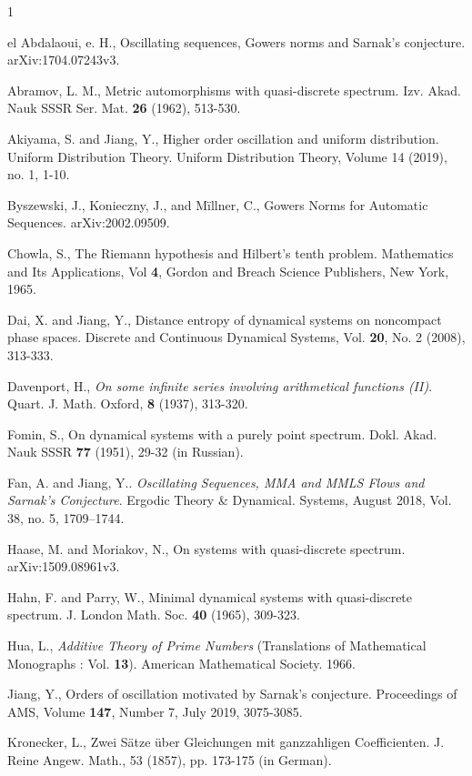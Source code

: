 \documentclass[12pt,letterpaper]{amsart}
\begin{document}
\begin{thebibliography}{1}

 el Abdalaoui, e. H., Oscillating sequences, Gowers norms and Sarnak’s conjecture. arXiv:1704.07243v3.

 Abramov, L. M., Metric automorphisms with quasi-discrete spectrum. Izv. Akad.
Nauk SSSR Ser. Mat. {\bf 26} (1962), 513-530.

 Akiyama, S. and Jiang, Y., Higher order oscillation and uniform distribution. Uniform Distribution Theory. Uniform Distribution Theory, Volume 14 (2019), no. 1, 1-10. 

 Byszewski, J., Konieczny, J., and M\"illner, C., Gowers Norms for Automatic Sequences. arXiv:2002.09509.

  Chowla, S., The Riemann hypothesis and Hilbert’s tenth problem. Mathematics and Its Applications, Vol {\bf 4}, Gordon and Breach Science Publishers, New York, 1965.

  Dai, X. and Jiang, Y., Distance entropy of dynamical systems on noncompact phase spaces. Discrete and Continuous Dynamical Systems, Vol. {\bf 20}, No. 2 (2008), 313-333.

 Davenport, H., {\em On some infinite series involving arithmetical functions (II)}. Quart. J. Math. Oxford, {\bf 8} (1937), 313-320.

 Fomin, S., On dynamical systems with a purely point spectrum. Dokl. Akad. Nauk SSSR {\bf 77} (1951), 29-32 (in Russian).

 Fan, A. and Jiang, Y.. {\em Oscillating Sequences, MMA and MMLS Flows and Sarnak's Conjecture}. Ergodic Theory \& Dynamical. Systems, August 2018, Vol. 38, no. 5, 1709–1744.

 Haase, M. and Moriakov, N., On systems with quasi-discrete spectrum. arXiv:1509.08961v3.

 Hahn, F. and Parry, W., Minimal dynamical systems with quasi-discrete spectrum.
J. London Math. Soc. {\bf 40} (1965), 309-323.

 Hua, L.,  {\it Additive Theory of Prime Numbers} (Translations of Mathematical Monographs : Vol. {\bf 13}). American Mathematical Society. 1966.

 Jiang, Y., Orders of oscillation motivated by Sarnak's conjecture. Proceedings of AMS, Volume {\bf 147}, Number 7, July 2019, 3075-3085.

 Kronecker, L., Zwei S\"atze \"uber Gleichungen mit ganzzahligen Coefficienten. J. Reine Angew. Math., 53 (1857), pp. 173-175 (in German).


\end{thebibliography}
\end{document}
